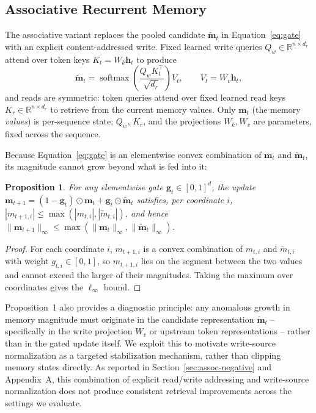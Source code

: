 \documentclass[10pt]{article} %
\newtheorem{proposition}{Proposition}
\begin{document}
\subsection{Associative Recurrent Memory}
\label{sec:assoc-model}
The associative variant replaces the pooled candidate $\mathbf{\tilde
m}_t$ in Equation~\ref{eq:gate} with an explicit content-addressed write.
Fixed learned write queries $Q_w \in \mathbb{R}^{n \times d_r}$ attend over
token keys $K_t = W_k \mathbf{h}_t$ to produce
\begin{equation}
  \mathbf{\tilde m}_t = \operatorname{softmax}\!\left(\frac{Q_w K_t^\top}{\sqrt{d_r}}\right) V_t,
  \qquad V_t = W_v \mathbf{h}_t,
\end{equation}
and reads are symmetric: token queries attend over fixed learned read keys
$K_r \in \mathbb{R}^{n \times d_r}$ to retrieve from the current memory
values. Only $\mathbf{m}_t$ (the memory \emph{values}) is per-sequence
state; $Q_w$, $K_r$, and the projections $W_k, W_v$ are parameters, fixed
across the sequence.

Because Equation~\ref{eq:gate} is an elementwise convex combination of
$\mathbf{m}_t$ and $\mathbf{\tilde m}_t$, its magnitude cannot grow beyond
what is fed into it:

\begin{proposition}
For any elementwise gate $\mathbf{g}_t \in [0,1]^{d}$, the update
$\mathbf{m}_{t+1} = (1-\mathbf{g}_t)\odot \mathbf{m}_t + \mathbf{g}_t \odot
\mathbf{\tilde m}_t$ satisfies, per coordinate $i$,
$|m_{t+1,i}| \le \max(|m_{t,i}|, |\tilde m_{t,i}|)$, and hence
$\|\mathbf{m}_{t+1}\|_\infty \le \max(\|\mathbf{m}_t\|_\infty,
\|\mathbf{\tilde m}_t\|_\infty)$.
\end{proposition}
\begin{proof}
For each coordinate $i$, $m_{t+1,i}$ is a convex combination of $m_{t,i}$
and $\tilde m_{t,i}$ with weight $g_{t,i} \in [0,1]$, so $m_{t+1,i}$ lies on
the segment between the two values and cannot exceed the larger of their
magnitudes. Taking the maximum over coordinates gives the $\ell_\infty$
bound.
\end{proof}

Proposition~1 also provides a diagnostic principle: any anomalous growth
in memory magnitude must originate in the candidate representation
$\mathbf{\tilde m}_t$ -- specifically in the write projection $W_v$ or
upstream token representations -- rather than in the gated update
itself. We exploit this to motivate write-source normalization as a
targeted stabilization mechanism, rather than clipping memory states
directly. As reported in Section~\ref{sec:assoc-negative} and Appendix~A,
this combination of explicit read/write addressing and write-source
normalization does not produce consistent retrieval improvements across
the settings we evaluate.
\end{document}
